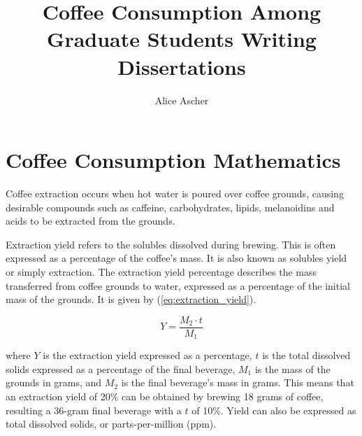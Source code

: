 \documentclass[thesis]{uofithesis} %
\title{Coffee Consumption Among Graduate Students Writing Dissertations}
\author{Alice Ascher}
\begin{document}
\maketitle



\tableofcontents


\chapter{Coffee Consumption Mathematics}

Coffee extraction occurs when hot water is poured over coffee grounds, causing 
desirable compounds such as caffeine, carbohydrates, lipids, melanoidins and 
acids to be extracted from the grounds.

Extraction yield refers to the solubles dissolved during brewing. This is often 
expressed as a percentage of the coffee's mass. It is also known as solubles 
yield or simply extraction. The extraction yield percentage describes the mass 
transferred from coffee grounds to water, expressed as a percentage of the 
initial mass of the grounds. It is given by (\ref{eq:extraction_yield}).

\begin{equation}\label{eq:extraction_yield}
    Y = \frac{M_2 \cdot t}{M_1}
\end{equation}
\tagstructend

where $Y$ is the extraction yield expressed as a percentage, $t$ is the total 
dissolved solids expressed as a percentage of the final beverage, $M_1$ is the 
mass of the grounds in grams, and $M_2$ is the final beverage's mass in grams. 
This means that an extraction yield of 20\% can be obtained by brewing 18 grams 
of coffee, resulting a 36-gram final beverage with a $t$ of 10\%. Yield can also 
be expressed as total dissolved solids, or parts-per-million (ppm).
\end{document}
